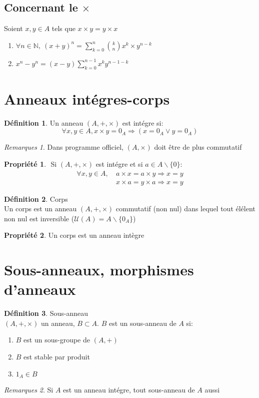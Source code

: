 \documentclass[fleqn]{article}
\theoremstyle{definition} \newtheorem*{defi}{D\'efinition}
\theoremstyle{definition} \newtheorem*{theo}{Th\'eor\`eme}
\theoremstyle{definition} \newtheorem*{coro}{Corollaire}
\theoremstyle{definition} \newtheorem*{nota}{Notation}
\theoremstyle{remark} \newtheorem*{rqs}{Remarques}
\theoremstyle{definition} \newtheorem*{prop}{Propri\'et\'e}
\begin{document}
\subsection{Concernant le $\times$}
Soient $x, y \in A$ tels que $x \times y = y \times x$
\begin{enumerate}
	\item $\forall n \in \mathbb{N},\ (x + y)^n = \sum_{k=0}^n \binom{k}{n}x^k \times y^{n-k}$
	\item $x^n - y^n = (x-y)\sum_{k=0}^{n-1}x^ky^{n-1-k}$
\end{enumerate}

\section{Anneaux int\'egres-corps}
\begin{defi}
	Un anneau $(A, + , \times)$ est int\'egre si:
	\[\forall x,y \in A, x\times y = 0_A \Rightarrow (x = 0_A \lor y = 0_A)\]
	\begin{rqs} Dans programme officiel, $(A, \times)$ doit \^etre de plus commutatif \end{rqs}
\end{defi}

\begin{prop} $ $
	Si $(A,+,\times)$ est int\'egre et si $a \in A\backslash \{0\}$:
		\begin{align*}
			\forall x,y \in A,\ & a \times x = a \times y \Rightarrow x = y \\
								& x \times a = y \times a \Rightarrow x = y
		\end{align*}
\end{prop}

\begin{defi} Corps \\
	Un corps est un anneau $(A,+,\times)$ commutatif (non nul) dans lequel tout \'el\'elent non nul est inversible
	($\mathcal{U}(A) = A\backslash\{0_A\}$)
\end{defi}

\begin{prop}
	Un corps est un anneau int\`egre
\end{prop}

\section{Sous-anneaux, morphismes d'anneaux}
\begin{defi} Sous-anneau \\
	$(A,+,\times)$ un anneau, $B \subset A$. $B$ est un sous-anneau de $A$ si:
	\begin{enumerate}
		\item $B$ est un sous-groupe de $(A,+)$
		\item $B$ est stable par produit
		\item $1_A \in B$
	\end{enumerate}

	\begin{rqs}
		Si $A$ est un anneau int\'egre, tout sous-anneau de $A$ aussi
	\end{rqs}
\end{defi}
\end{document}
